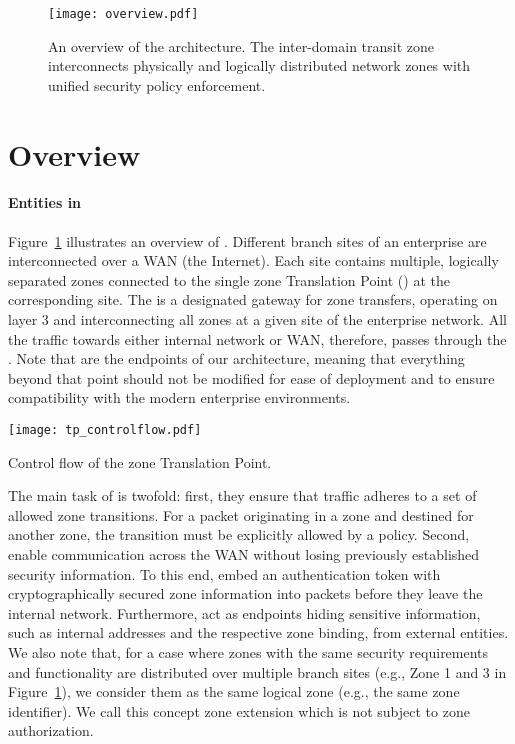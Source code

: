 \begin{figure}[htb]
	\begin{center}
		\texttt{[image: overview.pdf]}
	\end{center}
	\caption{An overview of the \name architecture. The inter-domain transit zone interconnects physically
		and logically distributed network zones with unified security policy enforcement.}
	\label{fig:overview}
\end{figure}

\section{\name Overview}
\label{sec:overview}

\paragraph{Entities in \name}
Figure~\ref{fig:overview} illustrates an overview of \name.
Different branch sites of an enterprise are interconnected over a WAN (\eg the Internet). Each site
contains multiple, logically separated zones connected to the single zone
Translation Point (\tp) at the corresponding site. The \tp is a designated gateway
for zone transfers, operating on layer 3 and interconnecting all zones at a given
site of the enterprise network. All the traffic towards either internal network or
WAN, therefore, passes through the \tp. Note that \tps are the endpoints
of our architecture, meaning that everything beyond that point should not be
modified for ease of deployment and to ensure compatibility with the modern enterprise
environments.

\begin{floatingfigure}[r]{0.69\linewidth}
	\centering
	\texttt{[image: tp\_controlflow.pdf]}
	\caption{Control flow of the zone Translation Point.}
	\label{fig:flow}
\end{floatingfigure}

The main task of \tps is twofold: first, they ensure that traffic adheres to a
set of allowed zone transitions. For a packet originating in a zone and destined
for another zone, the transition must be explicitly allowed by a policy. Second,
\tps enable communication across the WAN without losing previously established
security information. To this end, \tps embed an authentication token with
cryptographically secured zone information into packets before they leave the
internal network. Furthermore, \tps act as endpoints hiding sensitive
information, such as internal addresses and the respective zone binding, from
external entities. We also note that, for a case where zones with the same
security requirements and functionality are distributed over multiple branch
sites (e.g., Zone 1 and 3 in Figure~\ref{fig:overview}), we consider them as the
same logical zone (e.g., the same zone identifier). We call this concept zone
extension which is not subject to zone authorization.

